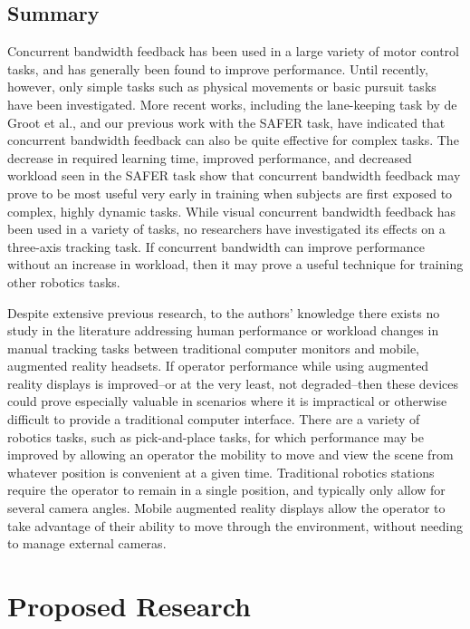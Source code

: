 \documentclass{paper}
\begin{document}
\subsection{Summary}

Concurrent bandwidth feedback has been used in a large variety of motor control tasks, and has generally been found to improve performance.
Until recently, however, only simple tasks such as physical movements or basic pursuit tasks have been investigated.
More recent works, including the lane-keeping task by de Groot et al., and our previous work with the SAFER task, have indicated that concurrent bandwidth feedback can also be quite effective for complex tasks.
The decrease in required learning time, improved performance, and decreased workload seen in the SAFER task show that concurrent bandwidth feedback may prove to be most useful very early in training when subjects are first exposed to complex, highly dynamic tasks.
While visual concurrent bandwidth feedback has been used in a variety of tasks, no researchers have investigated its effects on a three-axis tracking task.
If concurrent bandwidth can improve performance without an increase in workload, then it may prove a useful technique for training other robotics tasks.

Despite extensive previous research, to the authors' knowledge there exists no study in the literature addressing human performance or workload changes in manual tracking tasks between traditional computer monitors and mobile, augmented reality headsets.
If operator performance while using augmented reality displays is improved--or at the very least, not degraded--then these devices could prove especially valuable in scenarios where it is impractical or otherwise difficult to provide a traditional computer interface.
There are a variety of robotics tasks, such as pick-and-place tasks, for which performance may be improved by allowing an operator the mobility to move and view the scene from whatever position is convenient at a given time.
Traditional robotics stations require the operator to remain in a single position, and typically only allow for several camera angles.
Mobile augmented reality displays allow the operator to take advantage of their ability to move through the environment, without needing to manage external cameras.


\section{Proposed Research}
\end{document}
